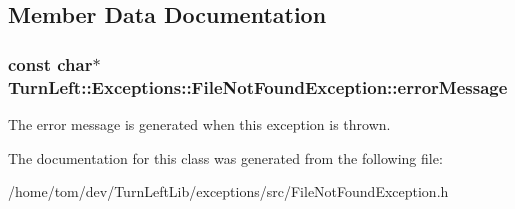 \subsection{Member Data Documentation}
\hypertarget{classTurnLeft_1_1Exceptions_1_1FileNotFoundException_afbbbe3c619326d3da7f577fe172ddc7a}{
\subsubsection[{errorMessage}]{\setlength{\rightskip}{0pt plus 5cm}const char$\ast$ {\bf TurnLeft::Exceptions::FileNotFoundException::errorMessage}}}
\label{classTurnLeft_1_1Exceptions_1_1FileNotFoundException_afbbbe3c619326d3da7f577fe172ddc7a}
The error message is generated when this exception is thrown. 

The documentation for this class was generated from the following file:\begin{DoxyCompactItemize}
\item 
/home/tom/dev/TurnLeftLib/exceptions/src/FileNotFoundException.h\end{DoxyCompactItemize}
